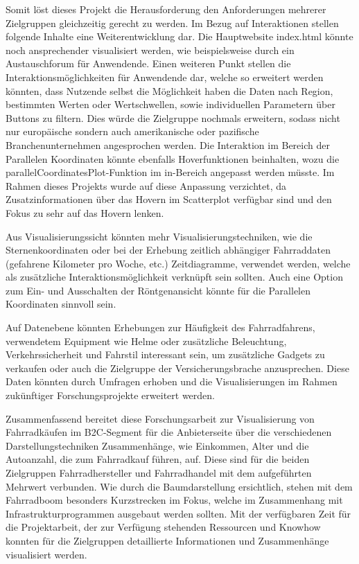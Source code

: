 \documentclass[usegeometry=true]{scrartcl}
\begin{document}
Somit löst dieses Projekt die Herausforderung den Anforderungen mehrerer Zielgruppen gleichzeitig gerecht zu werden.   
Im Bezug auf Interaktionen stellen folgende Inhalte eine Weiterentwicklung dar. Die Hauptwebsite index.html könnte noch ansprechender visualisiert werden, wie beispielsweise durch ein Austauschforum für Anwendende. Einen weiteren Punkt stellen die Interaktionsmöglichkeiten für Anwendende dar, welche so erweitert werden könnten, dass Nutzende selbst die Möglichkeit haben die Daten nach Region, bestimmten Werten oder Wertschwellen, sowie individuellen Parametern über Buttons zu filtern. Dies würde die Zielgruppe nochmals erweitern, sodass nicht nur europäische sondern auch amerikanische oder pazifische Branchenunternehmen angesprochen werden. Die Interaktion im Bereich der Parallelen Koordinaten könnte ebenfalls Hoverfunktionen beinhalten, wozu die parallelCoordinatesPlot-Funktion im in-Bereich angepasst werden müsste. Im Rahmen dieses Projekts wurde auf diese Anpassung verzichtet, da Zusatzinformationen über das Hovern im Scatterplot verfügbar sind und den Fokus zu sehr auf das Hovern lenken.

Aus Visualisierungssicht könnten mehr Visualisierungstechniken, wie die Sternenkoordinaten oder bei der Erhebung zeitlich abhängiger Fahrraddaten (gefahrene Kilometer pro Woche, etc.) Zeitdiagramme, verwendet werden, welche als zusätzliche Interaktionsmöglichkeit verknüpft sein sollten. Auch eine Option zum Ein- und Ausschalten der Röntgenansicht könnte für die Parallelen Koordinaten sinnvoll sein. 

Auf Datenebene könnten Erhebungen zur Häufigkeit des Fahrradfahrens, verwendetem Equipment wie Helme oder zusätzliche Beleuchtung, Verkehrssicherheit und Fahrstil interessant sein, um zusätzliche Gadgets zu verkaufen oder auch die Zielgruppe der Versicherungsbrache anzusprechen. Diese Daten könnten durch Umfragen erhoben und die Visualisierungen im Rahmen zukünftiger Forschungsprojekte erweitert werden.  

Zusammenfassend bereitet diese Forschungsarbeit zur Visualisierung von Fahrradkäufen im B2C-Segment für die Anbieterseite über die verschiedenen Darstellungstechniken Zusammenhänge, wie Einkommen, Alter und die Autoanzahl, die zum Fahrradkauf führen, auf. Diese sind für die beiden Zielgruppen Fahrradhersteller und Fahrradhandel mit dem aufgeführten Mehrwert verbunden. Wie durch die Baumdarstellung ersichtlich, stehen mit dem Fahrradboom besonders Kurzstrecken im Fokus, welche im Zusammenhang mit Infrastrukturprogrammen ausgebaut werden sollten. 
Mit der verfügbaren Zeit für die Projektarbeit, der zur Verfügung stehenden Ressourcen und Knowhow konnten für die Zielgruppen detaillierte Informationen und Zusammenhänge visualisiert werden. 
\newpage
\end{document}
